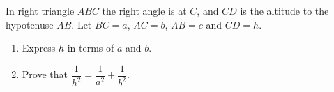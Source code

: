 In right triangle $ABC$ the right angle is at $C$, and $\overline{CD}$ is the altitude to the hypotenuse $\overline{AB}$. Let $BC=a$, $AC=b$, $AB=c$ and $CD=h$.
\begin{enumerate}
\item[(a)] Express $h$ in terms of $a$ and $b$.
\item[(b)] Prove that $\dfrac{1}{h^2}=\dfrac{1}{a^2}+\dfrac{1}{b^2}$.
\end{enumerate}
